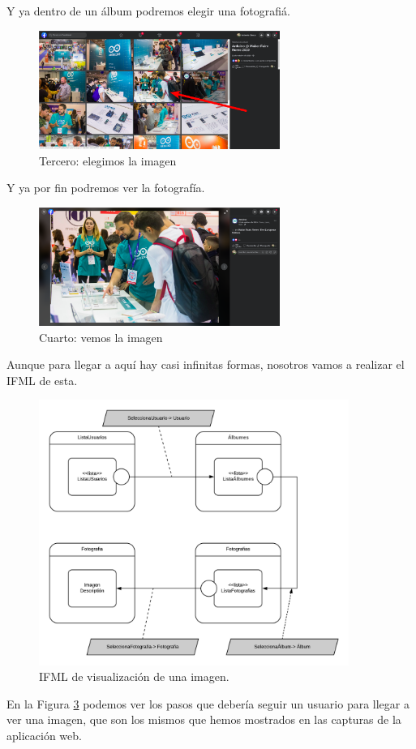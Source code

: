 \documentclass[12pt,a4paper]{article}
\begin{document}
Y ya dentro de un álbum podremos elegir una fotografiá. 
\begin{figure}[H]	
	\centering
	\includegraphics[width=0.7\textwidth]{images/capturas/seleccionImagen.png}
	\caption{Tercero: elegimos la imagen}
	\label{fig:selimagen}
\end{figure}
Y ya por fin podremos ver la fotografía. 
\begin{figure}[H]
	\centering
	\includegraphics[width=0.7\textwidth]{images/capturas/imagen.png}
	\caption{Cuarto: vemos la imagen}
	\label{fig:imagen}	
\end{figure}
Aunque para llegar a aquí hay casi infinitas formas, nosotros vamos a realizar el IFML de esta. 
\begin{figure}[H]
	\centering
	\includegraphics[width=0.9\textwidth]{images/ifml/seleccionProducto.png}
	\caption{IFML de visualización de una imagen. }
	\label{fig:ifmlimagen}	
\end{figure}
En la Figura \ref{fig:ifmlimagen} podemos ver los pasos que debería seguir un usuario para llegar a ver una imagen, que son los mismos que hemos mostrados en las capturas de la aplicación web. 
\end{document}
